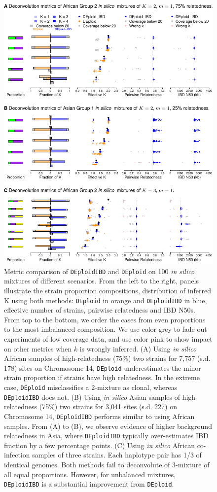 \documentclass[9pt,lineno]{elife}
\begin{document}
\begin{figure}[htp]
  \begin{center}
  \includegraphics[width=.9\textwidth]{Fig2.pdf}
  \caption{Metric comparison of \texttt{DEploidIBD} and \texttt{DEploid} on 100 {\it in silico} mixtures of different scenarios. From the left to the right, panels illustrate the strain proportion compositions, distribution of inferred K using both methods: {\tt DEploid} in orange and {\tt DEploidIBD} in blue, effective number of strains, pairwise relatedness and IBD N50s. From top to the bottom, we order the cases from even proportions to the most imbalanced composition. We use color grey to fade out experiments of low coverage data, and use color pink to show impact on other metrics when $k$ is wrongly inferred.
  (A) Using {\it in silico} African samples of high-relatedness (75\%) two strains for 7,757 (s.d. 178) sites on Chromosome 14, {\tt DEploid} underestimates the minor strain proportion if strains have high relatedness. In the extreme case, {\tt DEploid} misclassifies a $2$-mixture as clonal, whereas {\tt DEploidIBD} does not.
  (B) Using {\it in silico} Asian samples of high-relatedness (75\%) two strains for 3,041 sites (s.d. 227) on Chromosome 14, {\tt DEploidIBD} performs similar to using African samples.
  From (A) to (B), we observe evidence of higher background relatedness in Asia, where {\tt DEploidIBD} typically over-estimates IBD fraction by a few percentage points.
  (C) Using {\it in silico} African co-infection samples of three strains. Each haplotype pair has 1/3 of identical genomes. Both methods fail to deconvolute of 3-mixture of all equal proportions. However, for unbalanced mixtures, {\tt DEploidIBD} is a substantial improvement from {\tt DEploid}.
  }\label{fig:benchmark}
  \end{center}

\setcounter{fig2Counter}{\value{enumi}}
\end{figure}
\end{document}
